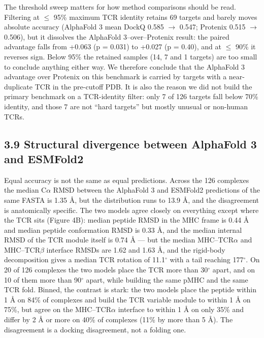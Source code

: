 \documentclass[
  11pt,
]{article}
\begin{document}
The threshold sweep matters for how method comparisons should be read.
Filtering at \ensuremath{\leq} 95\% maximum TCR identity retains 69 targets and barely
moves absolute accuracy (AlphaFold 3 mean DockQ 0.585 \ensuremath{\rightarrow} 0.547; Protenix
0.515 \ensuremath{\rightarrow} 0.506), but it dissolves the AlphaFold 3--over--Protenix result:
the paired advantage falls from +0.063 (p = 0.031) to +0.027 (p = 0.40),
and at \ensuremath{\leq} 90\% it reverses sign. Below 95\% the retained samples (14, 7
and 1 targets) are too small to conclude anything either way. We
therefore conclude that the AlphaFold 3 advantage over Protenix on this
benchmark is carried by targets with a near-duplicate TCR in the
pre-cutoff PDB. It is also the reason we did not build the primary
benchmark on a TCR-identity filter: only 7 of 126 targets fall below
70\% identity, and those 7 are not ``hard targets'' but mostly unusual
or non-human TCRs.

\subsection{3.9 Structural divergence between AlphaFold 3 and
ESMFold2}\label{structural-divergence-between-alphafold-3-and-esmfold2}

Equal accuracy is not the same as equal predictions. Across the 126
complexes the median C\ensuremath{\alpha} RMSD between the AlphaFold 3 and ESMFold2
predictions of the same FASTA is 1.35 \AA{}, but the distribution runs to
13.9 \AA{}, and the disagreement is anatomically specific. The two models
agree closely on everything except where the TCR sits (Figure 4B): median peptide
RMSD in the MHC frame is 0.44 \AA{} and median peptide conformation RMSD is
0.33 \AA{}, and the median internal RMSD of the TCR module itself is 0.74 \AA{}
--- but the median MHC--TCR\ensuremath{\alpha} and MHC--TCR\ensuremath{\beta} interface RMSDs are 1.62 and
1.63 \AA{}, and the rigid-body decomposition gives a median TCR rotation of
11.1\ensuremath{^{\circ}} with a tail reaching 177\ensuremath{^{\circ}}. On 20 of 126 complexes the two models
place the TCR more than 30\ensuremath{^{\circ}} apart, and on 10 of them more than 90\ensuremath{^{\circ}}
apart, while building the same pMHC and the same TCR fold. Binned, the
contrast is stark: the two models place the peptide within 1 \AA{} on 84\%
of complexes and build the TCR variable module to within 1 \AA{} on 75\%,
but agree on the MHC--TCR\ensuremath{\alpha} interface to within 1 \AA{} on only 35\% and differ
by 2 \AA{} or more on 40\% of complexes (11\% by more than 5 \AA{}). The
disagreement is a docking disagreement, not a folding one.
\end{document}
